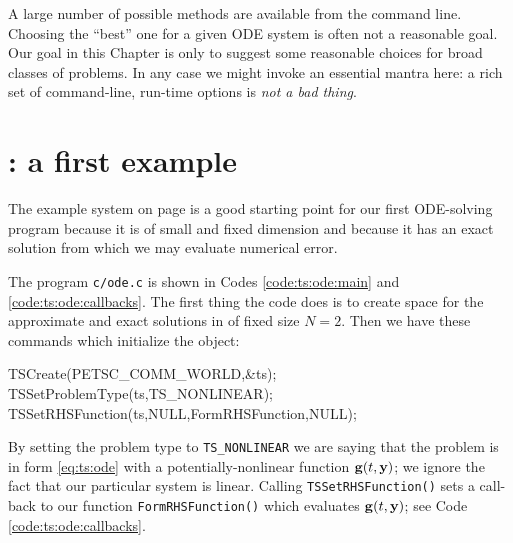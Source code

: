 A large number of possible methods are available from the \PETSc command line.   Choosing the ``best'' one for a given ODE system is often not a reasonable goal.  Our goal in this Chapter is only to suggest some reasonable choices for broad classes of problems.  In any case we might invoke an essential \PETSc mantra here: a rich set of command-line, run-time options is \emph{not a bad thing}.


\section{\PETSc \pTS: a first example}

The example system on page \pageref{ex:ts:odeeasy} is a good starting point for our first ODE-solving program because it is of small and fixed dimension and because it has an exact solution from which we may evaluate numerical error.


The program \texttt{c/\CODELOC ode.c} is shown in Codes \ref{code:ts:ode:main} and \ref{code:ts:ode:callbacks}.  The first thing the code does is to create space for the approximate and exact solutions in \pVecs of fixed size $N=2$.  Then we have these commands which initialize the \pTS object:
\begin{code}
  TSCreate(PETSC_COMM_WORLD,&ts);
  TSSetProblemType(ts,TS_NONLINEAR);
  TSSetRHSFunction(ts,NULL,FormRHSFunction,NULL);
\end{code}
By setting the problem type to \texttt{TS\_NONLINEAR} we are saying that the problem is in form \eqref{eq:ts:ode} with a potentially-nonlinear function $\mathbf{g}(t,\mathbf{y})$; we ignore the fact that our particular system is linear.  Calling \texttt{TSSetRHSFunction()} sets a call-back to our function \texttt{FormRHSFunction()} which evaluates $\mathbf{g}(t,\mathbf{y})$; see Code \ref{code:ts:ode:callbacks}.

